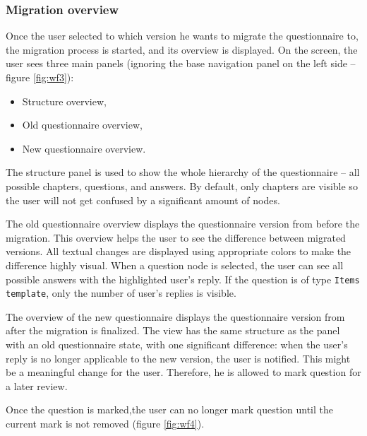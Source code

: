 

\subsubsection*{Migration overview}

Once the user selected to which version he wants to migrate the questionnaire to, the migration process is started, and its overview is displayed.
On the screen, the user sees three main panels (ignoring the base navigation panel on the left side -- figure \ref{fig:wf3}):

\begin{itemize}
    \item Structure overview,
    \item Old questionnaire overview,
    \item New questionnaire overview.
\end{itemize}

The structure panel is used to show the whole hierarchy of the questionnaire -- all possible chapters, questions, and answers.
By default, only chapters are visible so the user will not get confused by a significant amount of nodes.

The old questionnaire overview displays the questionnaire version from before the migration.
This overview helps the user to see the difference between migrated versions.
All textual changes are displayed using appropriate colors to make the difference highly visual.
When a question node is selected, the user can see all possible answers with the highlighted user's reply.
If the question is of type \texttt{Items template}, only the number of user's replies is visible.

The overview of the new questionnaire displays the questionnaire version from after the migration is finalized.
The view has the same structure as the panel with an old questionnaire state, with one significant difference: when the user's reply is no longer applicable to the new version, the user is notified.
This might be a meaningful change for the user.
Therefore, he is allowed to mark question for a later review.

Once the question is marked,the user can no longer mark question until the current mark is not removed (figure \ref{fig:wf4}).

